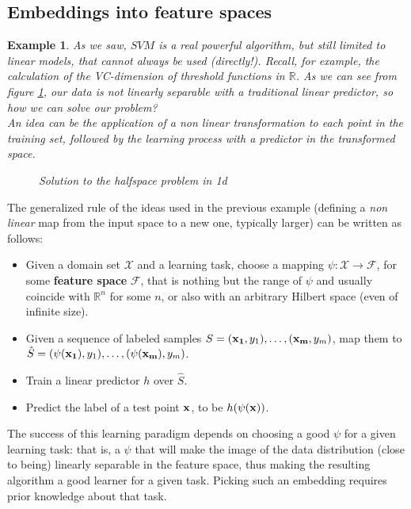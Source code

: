 \documentclass[12pt]{report}
\theoremstyle{plain}
\newtheorem{example}{Example}[chapter]
\newcommand\mcl[1]{\mathcal{#1}}
\begin{document}
\begin{flushleft}
\section{Embeddings into feature spaces}
\begin{example}
	As we saw, $SVM$ is a real powerful algorithm, but still limited to linear models, that cannot always be used (directly!). Recall, for example, the calculation of the VC-dimension of threshold functions in $\mathds{R}$. As we can see from figure \ref{fig:ex_halfspace_kernel}, our data is not linearly separable with a traditional linear predictor, so how we can solve our problem?\\
	An idea can be the application of a non linear transformation to each point in the training set, followed by the learning process with a predictor in the transformed space.
	\begin{figure}[!h]
		\caption{Solution to the halfspace problem in 1d}
		\label{fig:ex_halfspace_kernel}
	\end{figure}
\end{example}              
The generalized rule of the ideas used in the previous example (defining a \textit{non linear} map from the input space to a new one, typically larger) can be written as follows:
\begin{itemize}
	\item Given a domain set $\mcl{X}$ and a learning task, choose a mapping $\psi:\mcl{X}\to\mcl{F}$, for some \textbf{feature space} $\mcl{F}$, that is nothing but the range of $\psi$ and usually coincide with $\mathds{R}^n$ for some $n$, or also with an arbitrary Hilbert space (even of infinite size).
	\item Given a sequence of labeled samples $S=(\vb{x_1},y_1),\dots,(\vb{x_m},y_m)$, map them to $\hat{S}=(\psi(\vb{x_1}),y_1),\dots,(\psi(\vb{x_m}),y_m)$.
	\item Train a linear predictor $h$ over $\hat{S}$.
	\item Predict the label of a test point $\vb{x}$, to be $h(\psi(\vb{x}))$.
\end{itemize}
The success of this learning paradigm depends on choosing a good $\psi$ for a given learning task: that is, a $\psi$ that will make the image of the data distribution (close to being) linearly separable in the feature space, thus making the resulting algorithm a good learner for a given task. Picking such an embedding requires prior knowledge about that task.


\end{flushleft}
\end{document}
